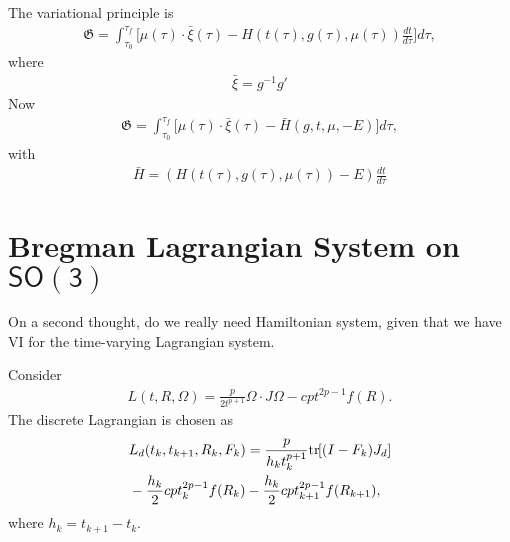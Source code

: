 \documentclass[letterpaper, 10pt, conference]{ieeeconf}
\newcommand{\bracket}[1]{\ensuremath{\left[ #1 \right]}}
\newcommand{\tr}[1]{\mbox{tr}\ensuremath{\negthickspace\bracket{#1}}}
\newcommand{\SO}{\ensuremath{\mathsf{SO(3)}}}
\begin{document}
The variational principle is
\begin{align*}
    \mathfrak{G} = \int_{\tau_0}^{\tau_f}  \big[ \mu(\tau) \cdot \bar\xi(\tau) - H(t(\tau), g(\tau), \mu(\tau)) \frac{dt}{d\tau}\big]  d\tau,
\end{align*}
where
\begin{align*}
    \bar \xi = g^{-1} g'
\end{align*}
Now
\begin{align*}
    \mathfrak{G} = \int_{\tau_0}^{\tau_f}  \big[ \mu(\tau) \cdot \bar\xi(\tau) - \bar H( g,t,\mu,-E) \big]  d\tau,
\end{align*}
with
\begin{align*}
    \bar H = (H(t(\tau), g(\tau), \mu(\tau))- E) \frac{dt}{d\tau}
\end{align*}

\section{Bregman Lagrangian System on $\SO$}

On a second thought, do we really need Hamiltonian system, given that we have VI for the time-varying Lagrangian system. 

Consider
\begin{align*}
    L(t,R,\Omega) = \frac{p}{2t^{p+1}} \Omega\cdot J\Omega - cpt^{2p-1} f(R).
\end{align*}
The discrete Lagrangian is chosen as
\begin{align*}
    & L_d(t_k, t_{k+1}, R_k, F_k) = \frac{p}{h_k t_k^{p+1}} \tr{(I-F_k)J_d}\\
    &- \frac{h_k}{2}c p t_k^{2p-1} f(R_k) - \frac{h_k}{2}c p t_{k+1}^{2p-1} f(R_{k+1}),
\end{align*}
where $h_k = t_{k+1}-t_k$.
\end{document}
